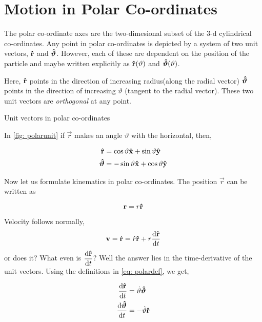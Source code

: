 \section{Motion in Polar Co-ordinates}

The polar co-ordinate axes are the two-dimesional subset of the 3-d cylindrical co-ordinates. 
Any point in polar co-ordinates is depicted by a system of two unit vectors, \(\boldsymbol{\mathbf{\hat{r}}}\) and
\(\boldsymbol{\mathbf{\hat{\vartheta}}}\). However, each of these are {dependent on the position of the particle} and
maybe written explicitly as \(\boldsymbol{\mathbf{\hat{r}}}(\vartheta)\) and \(\boldsymbol{\mathbf{\hat{\vartheta}}}(\vartheta)\).  

Here, \(\boldsymbol{\mathbf{\hat{r}}}\) points in the direction of increasing radius(along the radial vector)
\(\boldsymbol{\mathbf{\hat{\vartheta}}}\) points in the direction of increasing \(\vartheta\) (tangent to the radial vector).
These two unit vectors are \emph{orthogonal} at any point. 

\begin{marginfigure}
    \caption{Unit vectors in polar co-ordinates}
    \label{fig: polarunit}
\end{marginfigure}

In \cref{fig: polarunit} if \(\vec{r}\) makes
an angle \(\vartheta\) with the horizontal, then,

\begin{align}
    \label{eq: polardef}
    \boldsymbol{\mathbf{\hat{r}}} &= \cos \vartheta \boldsymbol{\mathbf{\hat{x}}} + \sin \vartheta \boldsymbol{\mathbf{\hat{y}}}\\
    \boldsymbol{\mathbf{\hat{\vartheta}}} &= -\sin \vartheta \boldsymbol{\mathbf{\hat{x}}} + \cos \vartheta \boldsymbol{\mathbf{\hat{y}}}
\end{align}

Now let us formulate kinematics in polar co-ordinates. The position \(\vec{r}\) can be written as

\begin{equation}
    \boldsymbol{\mathbf{r}} = r \boldsymbol{\mathbf{\hat{r}}}
\end{equation}

\noindent Velocity follows normally, 
\begin{equation}
    \boldsymbol{\mathbf{v}} = \dot{\boldsymbol{\mathbf{r}}} = \dot{r} \boldsymbol{\mathbf{\hat{r}}} + r\dv{\boldsymbol{\mathbf{\hat{r}}}}{t} 
\end{equation}
or does it? What even is \(\displaystyle\dv{\boldsymbol{\mathbf{\hat{r}}}}{t}\)? Well the answer lies in 
the time-derivative of the unit vectors. Using the definitions in \eqref{eq: polardef}, we get,

\begin{align}
    \dv{\boldsymbol{\mathbf{\hat{r}}}}{t} &= \dot{\vartheta} \boldsymbol{\mathbf{\hat{\vartheta}}}\\
    \dv{\boldsymbol{\mathbf{\hat{\vartheta}}}}{t} &= -\dot{\vartheta} \boldsymbol{\mathbf{\hat{r}}}
\end{align}

